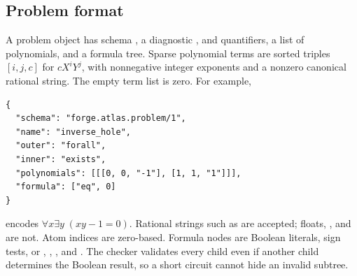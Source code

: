 \subsection{Problem format}
A problem object has schema , a diagnostic ,  and  quantifiers, a list of polynomials, and a formula tree. Sparse polynomial terms are sorted triples $[i,j,c]$ for $cX^iY^j$, with nonnegative integer exponents and a nonzero canonical rational string. The empty term list is zero. For example,
\begin{lstlisting}
{
  "schema": "forge.atlas.problem/1",
  "name": "inverse_hole",
  "outer": "forall",
  "inner": "exists",
  "polynomials": [[[0, 0, "-1"], [1, 1, "1"]]],
  "formula": ["eq", 0]
}
\end{lstlisting}
encodes $\forall x\exists y\;(xy-1=0)$. Rational strings such as  are accepted; floats, , and  are not. Atom indices are zero-based. Formula nodes are Boolean literals, sign tests, or , , , and . The checker validates every child even if another child determines the Boolean result, so a short circuit cannot hide an invalid subtree.

